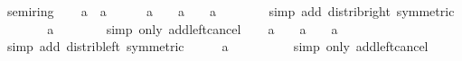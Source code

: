 \begin{isabellebody}
\isanewline
{}\isamarkupfalse%
\ semiring{\isacharunderscore}{\kern0pt}{}\isanewline
%
\isadelimproof
%
\endisadelimproof
%
\isatagproof
{}\isamarkupfalse%
\isanewline
\ \ \isamarkupfalse%
\ a\ {\isacharcolon}{\kern0pt}{\isacharcolon}{\kern0pt}\ {\isacharprime}{\kern0pt}a\isanewline
\ \ \isamarkupfalse%
\ {\isachardoublequoteopen}{}\ {\isacharasterisk}{\kern0pt}\ a\ {\isacharplus}{\kern0pt}\ {}\ {\isacharasterisk}{\kern0pt}\ a\ {\isacharequal}{\kern0pt}\ {}\ {\isacharasterisk}{\kern0pt}\ a\ {\isacharplus}{\kern0pt}\ {}{\isachardoublequoteclose}\isanewline
\ \ \ \ \isamarkupfalse%
\ {\isacharparenleft}{\kern0pt}simp\ add{\isacharcolon}{\kern0pt}\ distrib{\isacharunderscore}{\kern0pt}right\ {\isacharbrackleft}{\kern0pt}symmetric{\isacharbrackright}{\kern0pt}{\isacharparenright}{\kern0pt}\isanewline
\ \ \isamarkupfalse%
\ \isamarkupfalse%
\ {\isachardoublequoteopen}{}\ {\isacharasterisk}{\kern0pt}\ a\ {\isacharequal}{\kern0pt}\ {}{\isachardoublequoteclose}\isanewline
\ \ \ \ \isamarkupfalse%
\ {\isacharparenleft}{\kern0pt}simp\ only{\isacharcolon}{\kern0pt}\ add{\isacharunderscore}{\kern0pt}left{\isacharunderscore}{\kern0pt}cancel{\isacharparenright}{\kern0pt}\isanewline
\ \ \isamarkupfalse%
\ {\isachardoublequoteopen}a\ {\isacharasterisk}{\kern0pt}\ {}\ {\isacharplus}{\kern0pt}\ a\ {\isacharasterisk}{\kern0pt}\ {}\ {\isacharequal}{\kern0pt}\ a\ {\isacharasterisk}{\kern0pt}\ {}\ {\isacharplus}{\kern0pt}\ {}{\isachardoublequoteclose}\isanewline
\ \ \ \ \isamarkupfalse%
\ {\isacharparenleft}{\kern0pt}simp\ add{\isacharcolon}{\kern0pt}\ distrib{\isacharunderscore}{\kern0pt}left\ {\isacharbrackleft}{\kern0pt}symmetric{\isacharbrackright}{\kern0pt}{\isacharparenright}{\kern0pt}\isanewline
\ \ \isamarkupfalse%
\ \isamarkupfalse%
\ {\isachardoublequoteopen}a\ {\isacharasterisk}{\kern0pt}\ {}\ {\isacharequal}{\kern0pt}\ {}{\isachardoublequoteclose}\isanewline
\ \ \ \ \isamarkupfalse%
\ {\isacharparenleft}{\kern0pt}simp\ only{\isacharcolon}{\kern0pt}\ add{\isacharunderscore}{\kern0pt}left{\isacharunderscore}{\kern0pt}cancel{\isacharparenright}{\kern0pt}\isanewline
{}\isamarkupfalse%
%
\endisatagproof
{\isafoldproof}%
%
\isadelimproof
\isanewline
%
\endisadelimproof
\isanewline
{}\isamarkupfalse%

\end{isabellebody}
